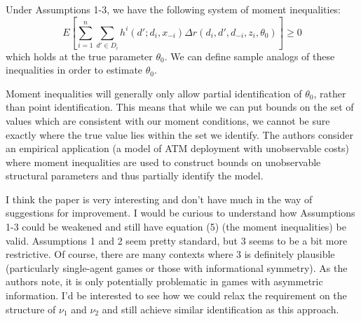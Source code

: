 \documentclass[12pt]{article}
\begin{document}
Under Assumptions 1-3, we have the following system of moment inequalities:
\[E\left[ \sum_{i=1}^n \sum_{d' \in D_i} h^i(d'; d_{i}, x_{-i}) \Delta r(d_i, d', d_{-i}, z_i, \theta_0)\right] \geq 0\]
which holds at the true parameter $\theta_0$. We can define sample analogs of these inequalities in order to estimate $\theta_0$.

Moment inequalities will generally only allow partial identification of $\theta_0$, rather than point identification. This means that while we can put bounds on the set of values which are consistent with our moment conditions, we cannot be sure exactly where the true value lies within the set we identify. The authors consider an empirical application (a model of ATM deployment with unobservable costs) where moment inequalities are used to construct bounds on unobservable structural parameters and thus partially identify the model. 

I think the paper is very interesting and don't have much in the way of suggestions for improvement. I would be curious to understand how Assumptions 1-3 could be weakened and still have equation (5) (the moment inequalities) be valid. Assumptions 1 and 2 seem pretty standard, but 3 seems to be a bit more restrictive. Of course, there are many contexts where 3 is definitely plausible (particularly single-agent games or those with informational symmetry). As the authors note, it is only potentially problematic in games with asymmetric information. I'd be interested to see how we could relax the requirement on the structure of $\nu_1$ and $\nu_2$ and still achieve similar identification as this approach. 
\end{document}
